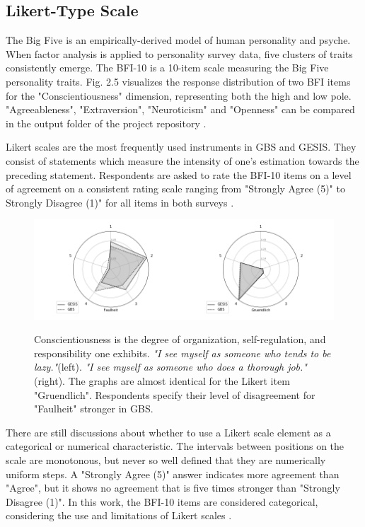 \subsection{Likert-Type Scale}

The Big Five is an empirically-derived model of human personality and psyche. When factor analysis is applied to personality survey data, five clusters of traits consistently emerge. The BFI-10 is a 10-item scale measuring the Big Five personality traits. Fig. 2.5 visualizes the response distribution of two BFI items for the "Conscientiousness" dimension, representing both the high and low pole. "Agreeableness", "Extraversion", "Neuroticism" and "Openness" can be compared in the output folder of the project repository \cite{rammstedt}. 

Likert scales are the most frequently used instruments in GBS and GESIS. They consist of statements which measure the intensity of one's estimation towards the preceding statement. Respondents are asked to rate the BFI-10 items on a level of agreement on a consistent rating scale ranging from "Strongly Agree (5)" to Strongly Disagree (1)" for all items in both surveys \cite{likert}. 

\begin{figure}[H]
	\begin{center}
		\captionsetup{width= 380pt}
		\includegraphics[scale=0.48,angle=0]{fig/Conscientiousness_figure}
		\label{Conscientiousness}
		\caption{Conscientiousness is the degree of organization, self-regulation, and responsibility one exhibits. \textit{"I see myself as someone who tends to be lazy."}(left). \textit{"I see myself as someone who does a thorough job."}(right). The graphs are almost identical for the Likert item "Gruendlich". Respondents specify their level of disagreement for "Faulheit" stronger in GBS.}
	\end{center}
\end{figure}

There are still discussions about whether to use a Likert scale element as a categorical or numerical characteristic. The intervals between positions on the scale are monotonous, but never so well defined that they are numerically uniform steps. A "Strongly Agree (5)" answer indicates more agreement than "Agree", but it shows no agreement that is five times stronger than "Strongly Disagree (1)". In this work, the BFI-10 items are considered categorical, considering the use and limitations of Likert scales \cite{likert3}.

